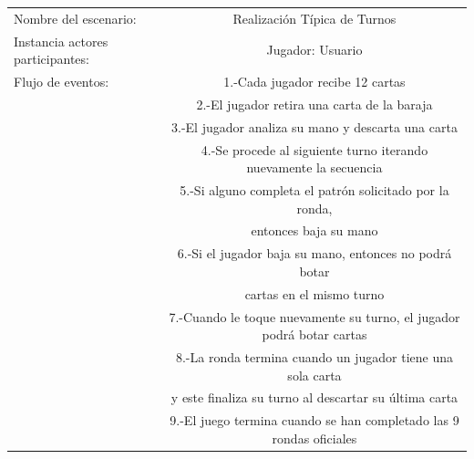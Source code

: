 \documentclass[60pt]{article}
\begin{document}
\begin{center}
    \begin{tabular}{ l | c  }
        Nombre del escenario: & Realización Típica de Turnos \\
        Instancia actores participantes: & Jugador: Usuario \\\hline
        Flujo de eventos: &  1.-Cada jugador recibe 12 cartas\\
        & 2.-El jugador retira una carta de la   baraja\\   
        & 3.-El jugador analiza su mano y descarta una carta\\  
        & 4.-Se procede al siguiente turno iterando nuevamente la secuencia\\
        & 5.-Si alguno completa el   patrón solicitado por la ronda,\\
        & entonces baja su mano\\
        & 6.-Si el jugador baja su mano, entonces no podrá botar \\
        & cartas en el mismo turno\\
        & 7.-Cuando le toque nuevamente su turno, el jugador podrá botar cartas\\
        & 8.-La ronda termina cuando un jugador tiene una sola carta\\
        & y este finaliza su turno al descartar su última carta\\
        & 9.-El juego termina cuando se han completado las 9 rondas oficiales\\
        \hline
    \end{tabular}
\end{center}
\end{document}
